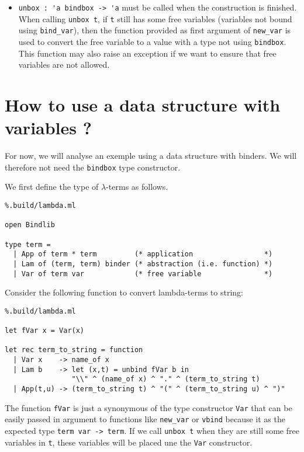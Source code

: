 \documentclass[11pt]{article}
\begin{document}
\begin{itemize}
\item \verb#unbox : 'a bindbox -> 'a# must be called when the
  construction is finished. When calling \verb#unbox t#, if
  \verb#t# still has some free variables (variables not bound
  using \verb#bind_var#), then the function provided as
  first argument of \verb#new_var# is used to convert the free
  variable to a value with a type not using \verb#bindbox#. This
  function may also raise an exception if we want to ensure that
  free variables are not allowed.
\end{itemize}

\section{How to use a data structure with variables ?}

For now, we will analyse an exemple using a data structure with
binders. We will therefore not need the \verb#bindbox# type constructor.

We first define the type of $\lambda$-terms as follows.
\begin{lstlisting}%.build/lambda.ml

open Bindlib

type term =
  | App of term * term         (* application                 *)
  | Lam of (term, term) binder (* abstraction (i.e. function) *)
  | Var of term var            (* free variable               *)
\end{lstlisting}

Consider the following function to convert lambda-terms to string:

\begin{lstlisting}%.build/lambda.ml

let fVar x = Var(x)

let rec term_to_string = function
  | Var x    -> name_of x
  | Lam b    -> let (x,t) = unbind fVar b in
                "\\" ^ (name_of x) ^ "." ^ (term_to_string t)
  | App(t,u) -> (term_to_string t) ^ "(" ^ (term_to_string u) ^ ")"
\end{lstlisting}

The function \verb!fVar! is just a synonymous of the type constructor
\verb!Var! that can be easily passed in argument to functions like
\verb#new_var# or \verb#vbind# because it as the expected type
\verb#term var -> term#. If we call \verb#unbox t# when they are still
some free variables in \verb#t#, these variables will be placed une
the \verb#Var# constructor.
\end{document}
